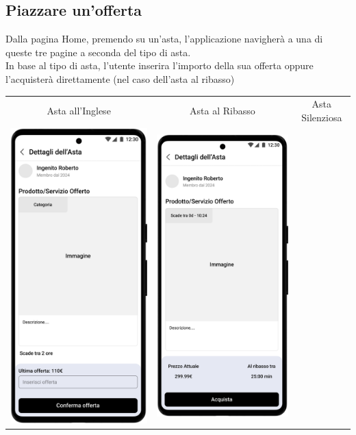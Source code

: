 \newpage
\subsection{Piazzare un'offerta}
Dalla pagina Home, premendo su un'asta, l'applicazione navigherà a una di queste tre pagine a seconda del tipo di asta.\\
In base al tipo di asta, l'utente inserira l'importo della sua offerta oppure l'acquisterà direttamente (nel caso dell'asta al ribasso)

\begin{center}
	\begin{tabular}{ccc}
		Asta all'Inglese                                                                   &
		Asta al Ribasso                                                                    &
		Asta Silenziosa                                                                      \\
		\includegraphics[width=.3\textwidth]{assets/mockup/Dettaglio Asta all'Inglese.png} &
		\includegraphics[width=.3\textwidth]{assets/mockup/Dettaglio Asta al Ribasso.png}  &

\end{tabular}
\end{center}
